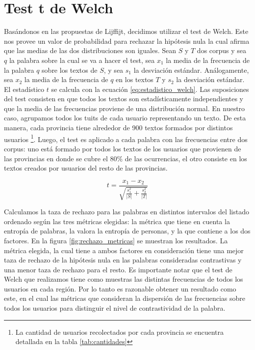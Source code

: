 \section{Test t de Welch}
Basándonos en las propuestas de Lijffijt, decidimos utilizar el test de Welch. Este nos provee un valor de probabilidad para rechazar la hipótesis nula la cual afirma que las medias de las dos distribuciones son iguales. Sean $S$ y $T$ dos corpus y sea $q$ la palabra sobre la cual se va a hacer el test, sea $x_1$ la media de la frecuencia de la palabra $q$ sobre los textos de $S$, y sea $s_1$ la desviación estándar. Análogamente, sea $x_2$ la media de la frecuencia de $q$ en los textos $T$ y $s_2$ la desviación estándar. El estadístico $t$ se calcula con la ecuación \ref{eq:estadistico_welch}. Las suposiciones del test consisten en que todos los textos son estadísticamente independientes y que la media de las frecuencias proviene de una distribución normal. En nuestro caso, agrupamos todos los tuits de cada usuario representando un texto. De esta manera, cada provincia tiene alrededor de 900 textos formados por distintos usuarios \footnote{La cantidad de usuarios recolectados por cada provincia se encuentra detallada en la tabla \ref{tab:cantidades}}. Luego, el test es aplicado a cada palabra con las frecuencias entre dos corpus: uno está formado por todos los textos de los usuarios que provienen de las provincias en donde se cubre el 80\% de las ocurrencias, el otro consiste en los textos creados por usuarios del resto de las provincias.

\begin{equation}
\label{eq:estadistico_welch}
 t = \frac{x_1-x_2}{\sqrt{\frac{s_1^2}{\lvert S \rvert}+\frac{s_2^2}{\lvert T \rvert}}}  
\end{equation}

Calculamos la taza de rechazo para las palabras en distintos intervalos del listado ordenado según las tres métricas elegidas: la métrica que tiene en cuenta la entropía de palabras, la valora la entropía de personas, y la que contiene a los dos factores. En la figura \ref{fig:rechazo_metricas} se muestran los resultados. La métrica elegida, la cual tiene a ambos factores en consideración tiene una mejor taza de rechazo de la hipótesis nula en las palabras consideradas contrastivas y una menor taza de rechazo para el resto. 
Es importante notar que el test de Welch que realizamos tiene como muestras las distintas frecuencias de todos los usuarios en cada región. Por lo tanto es razonable obtener un resultado como este, en el cual las métricas que consideran la dispersión de las frecuencias sobre todos los usuarios para distinguir el nivel de contrastividad de la palabra.

